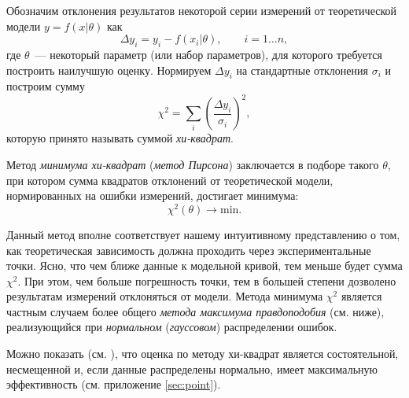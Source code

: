 Обозначим отклонения результатов некоторой серии измерений от теоретической
модели $y=f(x| \theta)$ как
\[
 \Delta y_i = y_i- f(x_i | \theta),\qquad i= 1\ldots n,
\]
где $\theta$~--- некоторый параметр (или набор параметров),
для которого требуется построить наилучшую оценку. Нормируем $\Delta y_i$
на стандартные отклонения $\sigma_i$ и построим сумму
\begin{equation}
    \chi^2 = \sum_i{\left(\frac{\Delta y_i}{\sigma_i}\right)^2},
    \label{eq:chi2}
\end{equation}
которую принято называть суммой \emph{хи-квадрат}.

Метод \emph{минимума хи-квадрат} (\emph{метод Пирсона}) заключается в подборе такого
$\theta$, при котором сумма квадратов отклонений от теоретической
модели, нормированных на ошибки измерений, достигает минимума:
\[
\chi^2(\theta) \to \mathrm{min}.
\]


Данный метод вполне соответствует нашему интуитивному представлению
о том, как теоретическая зависимость должна проходить через экспериментальные
точки. Ясно, что чем ближе данные к модельной кривой, тем
меньше будет сумма $\chi^2$. При этом, чем больше погрешность точки, тем
в большей степени дозволено результатам измерений отклоняться от модели.
Метода минимума $\chi^2$ является частным случаем
более общего \emph{метода максимума правдоподобия} (см. ниже),
реализующийся при \emph{нормальном} (\emph{гауссовом}) распределении ошибок.

Можно показать (см. \cite{idie}), что оценка по методу хи-квадрат является состоятельной,
несмещенной и, если данные распределены нормально,
имеет максимальную эффективность (см. приложение \ref{sec:point}).




